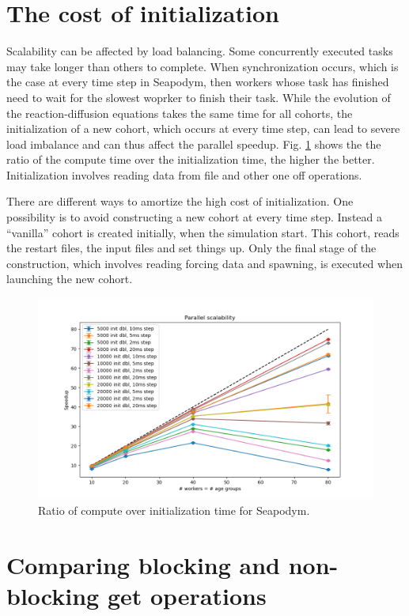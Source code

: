 \documentclass[a4paper,oneside,12pt]{article}
\begin{document}
\section{The cost of initialization}

Scalability can be affected by load balancing. Some concurrently executed tasks may take longer than others
to complete. When synchronization occurs, which is the case at every time step in Seapodym, then 
workers whose task has finished need to wait for the slowest woprker to finish their task. While the evolution of
the reaction-diffusion equations takes the same time for all cohorts, the initialization of a new cohort, which occurs
at every time step, can lead to severe load imbalance and can thus affect the parallel speedup. 
Fig. \ref{fig:c2i} shows the the ratio of the compute time over the initialization time, the higher the 
better. Initialization involves reading data from file and other one off operations. 

There are different ways to amortize the high cost of initialization. One possibility is to avoid constructing a new 
cohort at every time step. Instead a ``vanilla'' cohort is created initially, when the simulation start. This cohort,
reads the restart files, the input files and set things up. Only the final stage of the construction, which 
involves reading forcing data and spawning, is executed when launching the new cohort. 


\begin{figure}
    \includegraphics[width=15cm]{results/speedup_vs_workers.png}
    \caption{Ratio of compute over initialization time for Seapodym.}
    \label{fig:c2i}
\end{figure}

\section{Comparing blocking and non-blocking get operations}
\end{document}
